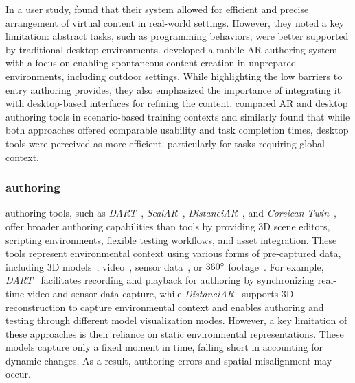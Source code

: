 In a user study, \citet{leeImmersiveAuthoringOfTangible2009} found that their \insitu system allowed for efficient and precise arrangement of virtual content in real-world settings. However, they noted a key limitation: abstract tasks, such as programming behaviors, were better supported by traditional \exsitu desktop environments. \citet{langlotzSketchingWorldSitu2012} developed a mobile AR authoring system with a focus on enabling spontaneous content creation in unprepared environments, including outdoor settings. While highlighting the low barriers to entry \insitu authoring provides, they also emphasized the importance of integrating it with \exsitu desktop-based interfaces for refining the content. \citet{vargasgonzalezComparisonDesktopAugmented2019} compared \insitu AR and \exsitu desktop authoring tools in scenario-based training contexts and similarly found that while both approaches offered comparable usability and task completion times, desktop tools were perceived as more efficient, particularly for tasks requiring global context.

\subsubsection{\Exsitu authoring}
\Exsitu authoring tools, such as \textit{DART}~\cite{macintyreDARTToolkitRapid2004}, \textit{ScalAR}~\cite{qianScalARAuthoringSemantically2022}, \textit{DistanciAR}~\cite{wangDistanciARAuthoringSiteSpecific2021}, and \textit{Corsican Twin}~\cite{prouzeauCorsicanTwinAuthoring2020}, offer broader authoring capabilities than \insitu tools by providing 3D scene editors, scripting environments, flexible testing workflows, and asset integration. These tools represent environmental context using various forms of pre-captured data, including 3D models~\cite{prouzeauCorsicanTwinAuthoring2020, qianScalARAuthoringSemantically2022, cavalloCAVEARVRAuthoring2019, lightship-ardk-niantic, googleGeospatialCreator}, video~\cite{macintyreDARTToolkitRapid2004, leivaRapidoPrototypingInteractive2021}, sensor data~\cite{macintyreDARTToolkitRapid2004}, or $360\degree$ footage~\cite{nebelingProtoARRapidPhysicalDigital2018}. For example, \textit{DART}~\cite{macintyreDARTToolkitRapid2004} facilitates recording and playback for authoring by synchronizing real-time video and sensor data capture, while \textit{DistanciAR}~\cite{wangDistanciARAuthoringSiteSpecific2021} supports \insitu 3D reconstruction to capture environmental context and enables \exsitu authoring and testing through different model visualization modes. However, a key limitation of these approaches is their reliance on static environmental representations. These models capture only a fixed moment in time, falling short in accounting for dynamic changes. As a result, authoring errors and spatial misalignment may occur.

